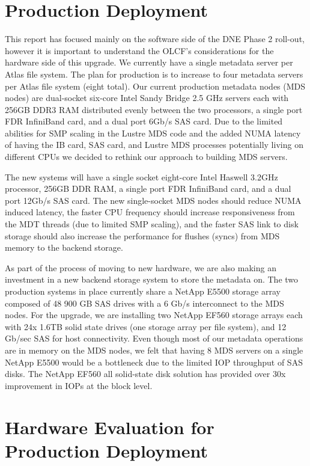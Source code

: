 \documentclass[conference,compsoc]{IEEEtran}
\begin{document}
\section{Production Deployment}

This report has focused mainly on the software side of the DNE Phase 2 roll-out,
however it is important to understand the OLCF's considerations for the
hardware side of this upgrade. We currently have a single metadata server per
Atlas file system. The plan for production is to increase to four metadata
servers per Atlas file system (eight total). Our current production metadata
nodes (MDS nodes) are dual-socket six-core Intel Sandy Bridge 2.5 GHz servers
each with 256GB DDR3 RAM distributed evenly between the two processors, a
single port FDR InfiniBand card, and a dual port 6Gb/s SAS card. Due to the
limited abilities for SMP scaling in the Lustre MDS code and the added NUMA
latency of having the IB card, SAS card, and Lustre MDS processes potentially
living on different CPUs we decided to rethink our approach to building MDS
servers.

The new systems will have a single socket eight-core Intel Haswell 3.2GHz
processor, 256GB DDR RAM, a single port FDR InfiniBand card, and a dual port
12Gb/s SAS card. The new single-socket MDS nodes should reduce NUMA induced
latency, the faster CPU frequency should increase responsiveness from the MDT
threads (due to limited SMP scaling), and the faster SAS link to disk storage
should also increase the performance for flushes (syncs) from MDS memory to the
backend storage.

As part of the process of moving to new hardware, we are also making an
investment in a new backend storage system to store the metadata on. The two
production systems in place currently share a NetApp E5500 storage array
composed of 48 900 GB SAS drives with a 6 Gb/s interconnect to the MDS nodes. For
the upgrade, we are installing two NetApp EF560 storage arrays each with 24x
1.6TB solid state drives (one storage array per file system), and 12 Gb/sec SAS
for host connectivity. Even though most of our metadata operations are in
memory on the MDS nodes, we felt that having 8 MDS servers on a single NetApp
E5500 would be a bottleneck due to the limited IOP throughput of SAS disks. The
NetApp EF560 all solid-state disk solution has provided over 30x improvement in
IOPs at the block level.

\section{Hardware Evaluation for Production Deployment}
\end{document}
